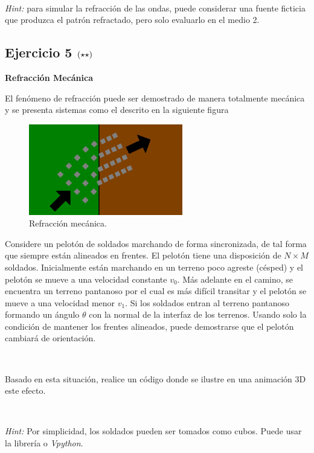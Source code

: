\

\textit{Hint:} para simular la refracción de las ondas, puede considerar 
una fuente ficticia que produzca el patrón refractado, pero solo evaluarlo
en el medio 2.



\newpage
\subsection*{Ejercicio 5 \large{$\left( \star \star \right)$}}

\textbf{Refracción Mecánica}

El fenómeno de refracción puede ser demostrado de manera totalmente mecánica
y se presenta sistemas como el descrito en la siguiente figura

\begin{figure}[htbp]
	\centering
	\includegraphics[width=0.60\textwidth]
	{./pictures/soldiers.png}

	\caption{\small{Refracción mecánica.}}
	
	\label{fig:mechanical_refraction}
\end{figure}

Considere un pelotón de soldados marchando de forma sincronizada, de tal  
forma que siempre están alineados en frentes. El pelotón tiene una 
disposición de $N\times M$ soldados. Inicialmente están marchando en 
un terreno poco agreste (césped) y el pelotón se mueve a una velocidad
constante $v_0$. Más adelante en el camino, se encuentra un terreno 
pantanoso por el cual es más difícil transitar y el pelotón se mueve a 
una velocidad menor $v_1$. Si los soldados entran al terreno pantanoso
formando un ángulo $\theta$ con la normal de la interfaz de los terrenos.
Usando solo la condición de mantener los frentes alineados, puede 
demostrarse que el pelotón cambiará de orientación.

\

Basado en esta situación, realice un código donde se ilustre en una 
animación 3D este efecto.

\

\textit{Hint:} Por simplicidad, los soldados pueden ser tomados como cubos.
Puede usar la librería \mayavi o \textit{Vpython}.

